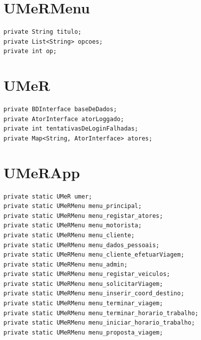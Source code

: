 \section{UMeRMenu}
\begin{verbatim}
private String titulo;
private List<String> opcoes;
private int op;
\end{verbatim}

\section{UMeR}
\begin{verbatim}
private BDInterface baseDeDados;
private AtorInterface atorLoggado;
private int tentativasDeLoginFalhadas;
private Map<String, AtorInterface> atores;
\end{verbatim}

\section{UMeRApp}
\begin{verbatim}
private static UMeR umer;
private static UMeRMenu menu_principal;
private static UMeRMenu menu_registar_atores;
private static UMeRMenu menu_motorista;
private static UMeRMenu menu_cliente;
private static UMeRMenu menu_dados_pessoais;
private static UMeRMenu menu_cliente_efetuarViagem;
private static UMeRMenu menu_admin;
private static UMeRMenu menu_registar_veiculos;
private static UMeRMenu menu_solicitarViagem; 
private static UMeRMenu menu_inserir_coord_destino;
private static UMeRMenu menu_terminar_viagem; 
private static UMeRMenu menu_terminar_horario_trabalho;
private static UMeRMenu menu_iniciar_horario_trabalho;
private static UMeRMenu menu_proposta_viagem;
\end{verbatim}




